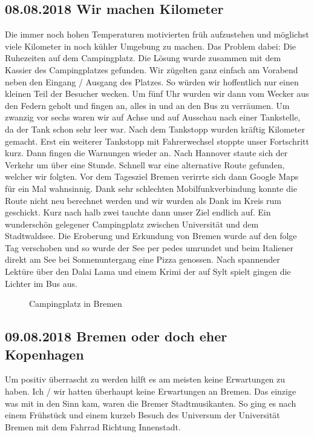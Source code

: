 \subsection{08.08.2018 Wir machen Kilometer}
Die immer noch hohen Temperaturen motivierten früh aufzustehen und möglichst viele Kilometer in noch kühler Umgebung zu machen.
Das Problem dabei: Die Ruhezeiten auf dem Campingplatz.
Die Lösung wurde zusammen mit dem Kassier des Campingplatzes gefunden. Wir zügelten ganz einfach am Vorabend neben den Eingang / Ausgang des Platzes.
So würden wir hoffentlich nur einen kleinen Teil der Besucher wecken.
Um fünf Uhr wurden wir dann vom Wecker aus den Federn geholt und fingen an, alles in und an den Bus zu verräumen.
Um zwanzig vor sechs waren wir auf Achse und auf Ausschau nach einer Tankstelle, da der Tank schon sehr leer war.
Nach dem Tankstopp wurden kräftig Kilometer gemacht.
Erst ein weiterer Tankstopp mit Fahrerwechsel stoppte unser Fortschritt kurz.
Dann fingen die Warnungen wieder an. 
Nach Hannover staute sich der Verkehr um über eine Stunde.
Schnell war eine alternative Route gefunden, welcher wir folgten.
Vor dem Tagesziel Bremen verirrte sich dann Google Maps für ein Mal wahnsinnig. 
Dank sehr schlechten Mobilfunkverbindung konnte die Route nicht neu berechnet werden und wir wurden als Dank im Kreis rum geschickt.
Kurz nach halb zwei tauchte dann unser Ziel endlich auf.
Ein wunderschön gelegener Campingplatz zwischen Universität und dem Stadtwaldsee.
Die Eroberung und Erkundung von Bremen wurde auf den folge Tag verschoben und so wurde der See per pedes umrundet und beim Italiener direkt am See bei Sonnenuntergang eine Pizza genossen.
Nach spannender Lektüre über den Dalai Lama und einem Krimi der auf Sylt spielt gingen die Lichter im Bus aus.

\begin{figure}[H]
   \centering
   \quad
   \quad
   \quad
   \caption[Campingplatz in Bremen]{Campingplatz in Bremen}
\end{figure}

\subsection{09.08.2018 Bremen oder doch eher Kopenhagen}
Um positiv überrascht zu werden hilft es am meisten keine Erwartungen zu haben.
Ich / wir hatten überhaupt keine Erwartungen an Bremen.
Das einzige was mit in den Sinn kam, waren die Bremer Stadtmusikanten.
So ging es nach einem Frühstück und einem kurzeb Besuch des Universum der Universität Bremen mit dem Fahrrad Richtung Innenstadt.


